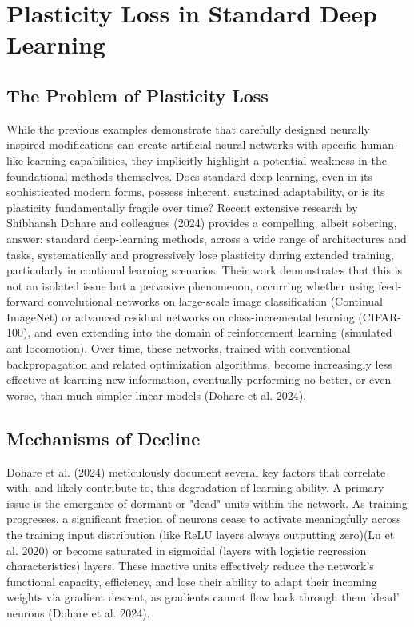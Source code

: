 \documentclass[
10pt, %
a4paper, %
oneside, %
headinclude,footinclude, %
BCOR5mm, %
]{scrartcl}
\begin{document}
\section{Plasticity Loss in Standard Deep Learning}

\subsection{The Problem of Plasticity Loss}

While the previous examples demonstrate that carefully designed neurally inspired modifications can create artificial neural networks with specific human-like learning capabilities, they implicitly highlight a potential weakness in the foundational methods themselves. Does standard deep learning, even in its sophisticated modern forms, possess inherent, sustained adaptability, or is its plasticity fundamentally fragile over time? Recent extensive research by Shibhansh Dohare and colleagues (2024) provides a compelling, albeit sobering, answer: standard deep-learning methods, across a wide range of architectures and tasks, systematically and progressively lose plasticity during extended training, particularly in continual learning scenarios. Their work demonstrates that this is not an isolated issue but a pervasive phenomenon, occurring whether using feed-forward convolutional networks on large-scale image classification (Continual ImageNet) or advanced residual networks on class-incremental learning (CIFAR-100), and even extending into the domain of reinforcement learning (simulated ant locomotion). Over time, these networks, trained with conventional backpropagation and related optimization algorithms, become increasingly less effective at learning new information, eventually performing no better, or even worse, than much simpler linear models (Dohare et al. 2024).

\subsection{Mechanisms of Decline}

Dohare et al. (2024) meticulously document several key factors that correlate with, and likely contribute to, this degradation of learning ability. A primary issue is the emergence of dormant or "dead" units within the network. As training progresses, a significant fraction of neurons cease to activate meaningfully across the training input distribution (like ReLU layers always outputting zero)(Lu et al. 2020) or become saturated in sigmoidal (layers with logistic regression characteristics) layers. These inactive units effectively reduce the network's functional capacity, efficiency, and lose their ability to adapt their incoming weights via gradient descent, as gradients cannot flow back through them 'dead' neurons (Dohare et al. 2024). 
\end{document}
